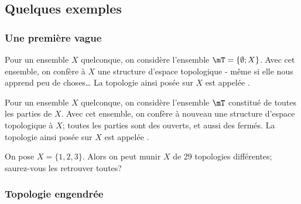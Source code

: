 \subsection{Quelques exemples}

\subsubsection{Une première vague}

\begin{example}\label{DefTopologieGrossiere}
  Pour un ensemble \( X \) quelconque, on considère l'ensemble \( \mT = \{ \emptyset; X\} \). Avec cet ensemble, on confère à \(X \) une structure d'espace topologique - même si elle nous apprend peu de choses\dots{} La topologie ainsi posée sur \(X \) est appelée .
\end{example}

\begin{example}\label{DefTopologieDiscrete}
  Pour un ensemble \( X \) quelconque, on considère l'ensemble \( \mT \) constitué de toutes les parties de \( X \). Avec cet ensemble, on confère à nouveau une structure d'espace topologique à \(X \); toutes les parties sont des ouverts, et aussi des fermés. La topologie ainsi posée sur \(X \) est appelée .
\end{example}

\begin{example} 
    On pose \( X = \{1, 2, 3\} \). Alors on peut munir \( X \) de 29 topologies différentes\cite{BIBooSLBZooRYtdIi}; saurez-vous les retrouver toutes?
\end{example}

\subsubsection{Topologie engendrée}

